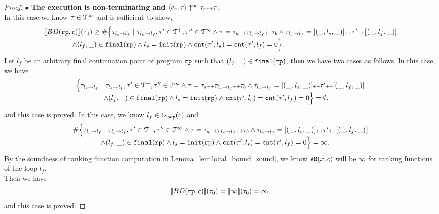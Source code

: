 \begin{proof}
\textbf{$\bullet$ The execution is non-terminating and {$\langle {c_r}, \mathtt{\tau} \rangle \uparrow^{\infty} \mathtt{\tau}_r {\scriptscriptstyle ++} \mathtt{\tau}$}.} 
\\
 In this case we know $\mathtt{\tau} \in \mathcal{T}^{\infty}$ and is sufficient to show,
 \[
  \begin{array}{l}
  \llbracket BD(\mathtt{rp}, c) \rrbracket(\mathtt{\tau}_0) \geq
  \# \Big\{\mathtt{\tau}_{l_s \to l_f} ~\vert~ \mathtt{\tau}_{l_s \to l_f}, \mathtt{\tau}'\in \mathcal{T}^{+}, \mathtt{\tau}''\in \mathcal{T}^{\infty}
  \land \mathtt{\tau} = \mathtt{\tau}_a {\scriptscriptstyle ++} \mathtt{\tau}_{l_s \to l_f} {\scriptscriptstyle ++} \mathtt{\tau}_b
  \land \mathtt{\tau}_{l_s \to l_f} = [(\_, l_s, \_)] {\scriptscriptstyle ++} \mathtt{\tau}' {\scriptscriptstyle ++} [(\_, l_f, \_)]
\\ \qquad \qquad
  \land (l_{f}, \_) \in \mathtt{final}(\mathtt{rp})
  \land l_s = \mathtt{init}(\mathtt{rp})
  \land \mathtt{cnt}(\mathtt{\tau}', l_s) = \mathtt{cnt}(\mathtt{\tau}', l_f) = 0 
  \Big\}.
  \end{array}
\]
Let $l_f$ be an arbitrary final continuation point of program $\mathtt{rp}$ such that $(l_{f}, \_) \in \mathtt{final}(\mathtt{rp})$,
then we have two cases as follows.
In this case, we have 
\[
  \begin{array}{l}
  \Big\{\mathtt{\tau}_{l_s \to l_f} ~\vert~ \mathtt{\tau}_{l_s \to l_f}, \mathtt{\tau}'\in \mathcal{T}^{+}, \mathtt{\tau}''\in \mathcal{T}^{\infty}
    \land \mathtt{\tau} = \mathtt{\tau}_a {\scriptscriptstyle ++} \mathtt{\tau}_{l_s \to l_f} {\scriptscriptstyle ++} \mathtt{\tau}_b
    \land \mathtt{\tau}_{l_s \to l_f} = [(\_, l_s, \_)] {\scriptscriptstyle ++} \mathtt{\tau}' {\scriptscriptstyle ++} [(\_, l_f, \_)]
    \\ \qquad \qquad
  \land (l_{f}, \_) \in \mathtt{final}(\mathtt{rp})
  \land l_s = \mathtt{init}(\mathtt{rp})
  \land \mathtt{cnt}(\mathtt{\tau}', l_s) = \mathtt{cnt}(\mathtt{\tau}', l_f) = 0 
  \Big\} = \emptyset,
  \end{array}
\]
and this case is proved.
In this case, we know $l_f \in \mathtt{L}_{\mathtt{loop}}(c)$ and 
\[
  \begin{array}{l}
    \# \Big\{\mathtt{\tau}_{l_s \to l_f} ~\vert~ \mathtt{\tau}_{l_s \to l_f}, \mathtt{\tau}'\in \mathcal{T}^{+}, \mathtt{\tau}''\in \mathcal{T}^{\infty}
    \land \mathtt{\tau} = \mathtt{\tau}_a {\scriptscriptstyle ++} \mathtt{\tau}_{l_s \to l_f} {\scriptscriptstyle ++} \mathtt{\tau}_b
    \land \mathtt{\tau}_{l_s \to l_f} = [(\_, l_s, \_)] {\scriptscriptstyle ++} \mathtt{\tau}' {\scriptscriptstyle ++} [(\_, l_f, \_)]
    \\ \qquad \qquad
  \land (l_{f}, \_) \in \mathtt{final}(\mathtt{rp})
  \land l_s = \mathtt{init}(\mathtt{rp})
  \land \mathtt{cnt}(\mathtt{\tau}', l_s) = \mathtt{cnt}(\mathtt{\tau}', l_f) = 0 
  \Big\} = \infty.
  \end{array}
\]
By the soundness of ranking function computation in Lemma~\ref{lem:local_bound_sound}, we know ${\mathtt{VB}}(x, c)$ will be $\infty$ for ranking functions of the loop $l_f$.
\\
Then we have 
\[
  \llbracket BD(\mathtt{rp}, c) \rrbracket(\mathtt{\tau}_0) = \llbracket \infty \rrbracket(\mathtt{\tau}_0) = \infty,
\]
and this case is proved.
\end{proof}